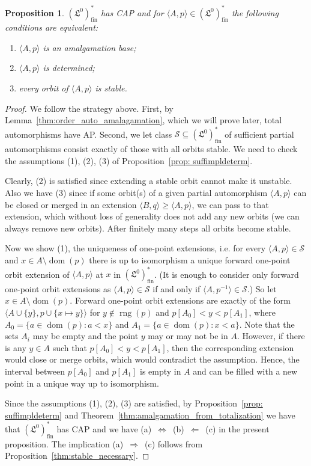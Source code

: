 \documentclass[oneside,notitlepage,12pt]{article}
\newtheorem{prop}[tw]{Proposition}
\theoremstyle{definition}
\theoremstyle{remark}
\newcommand \seq [1]{\langle #1 \rangle}
\newcommand \dom {\operatorname{dom}}
\newcommand \rng {\operatorname{rng}}
\newcommand \Su {\mathscr{S}}
\newcommand \fin {{\operatorname{fin}}}
\newcommand \Lin {\mathfrak{L}}
\begin{document}
\begin{prop}\label{lo_totaliz}
    $(\Lin^0)^*_\fin$  has CAP and for $\seq{A,p}\in (\Lin^0)^*_\fin$ the following conditions are equivalent:
    \begin{enumerate}[label={\rm(\alph*)}]
        \item $\seq{A,p}$ is an amalgamation base;
        \item $\seq{A,p}$ is determined;  
        \item every orbit of $\seq{A,p}$ is stable.
    \end{enumerate}
\end{prop}

\begin{proof}
We follow the strategy above.
First, by Lemma~\ref{thm:order_auto_amalagamation}, which we will prove later, total automorphisms have AP.
Second, we let class $\Su \subseteq (\Lin^0)^*_\fin$ of sufficient partial automorphisms consist exactly of those with all orbits stable.
We need to check the assumptions (1), (2), (3) of Proposition~\ref{prop: suffimpldeterm}.

Clearly, (2) is satisfied since extending a stable orbit cannot make it unstable.
Also we have (3) since if some orbit(s) of a given partial automorphism $\seq{A, p}$ can be closed or merged in an extension $\seq{B, q} \geq \seq{A, p}$, we can pass to that extension, which without loss of generality does not add any new orbits (we can always remove new orbits).
After finitely many steps all orbits become stable.

Now we show (1), the uniqueness of one-point extensions, i.e. for every $\seq{A, p} \in \Su$ and $x \in A \setminus \dom(p)$ there is up to isomorphism a unique forward one-point orbit extension of $\seq{A, p}$ at $x$ in $(\Lin^0)^*_\fin$.
(It is enough to consider only forward one-point orbit extensions as $\seq{A, p} \in \Su$ if and only if $\seq{A, p^{-1}} \in \Su$.)
So let $x \in A \setminus \dom(p)$.
Forward one-point orbit extensions are exactly of the form $\seq{A \cup \{y\}, p \cup \{x \mapsto y\}}$ for $y \notin \rng(p)$ and $p[A_0] < y< p[A_1]$, where $A_0 = \{a \in \dom(p): a < x\}$ and $A_1 = \{a \in \dom(p): x < a\}$.
Note that the sets $A_i$ may be empty and the point $y$ may or may not be in $A$.
However, if there is any $y \in A$ such that $p[A_0] < y < p[A_1]$, then the corresponding extension would close or merge orbits, which would contradict the assumption.
Hence, the interval between $p[A_0]$ and $p[A_1]$ is empty in $A$ and can be filled with a new point in a unique way up to isomorphism.

Since the assumptions (1), (2), (3) are satisfied, by Proposition~\ref{prop: suffimpldeterm} and Theorem~\ref{thm:amalgamation_from_totalization} we have that $(\Lin^0)^*_\fin$ has CAP and we have (a)~$\Leftrightarrow$~(b)~$\Leftarrow$~(c) in the present proposition.
The implication (a)~$\Rightarrow$~(c) follows from Proposition~\ref{thm:stable_necessary}.
\end{proof}
\end{document}
